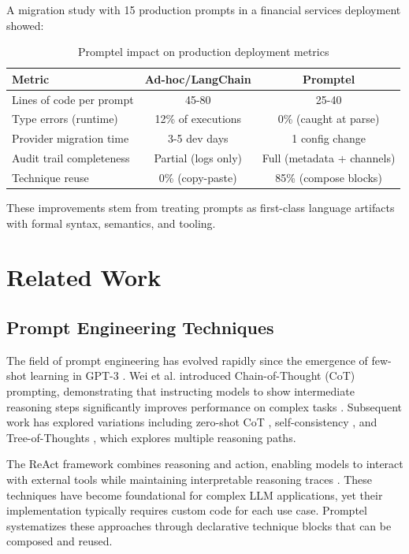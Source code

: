 \documentclass[11pt,a4paper]{article}
\begin{document}
A migration study with 15 production prompts in a financial services deployment showed:

\begin{table}[h]
\centering
\begin{tabular}{lcc}
\toprule
\textbf{Metric} & \textbf{Ad-hoc/LangChain} & \textbf{Promptel} \\
\midrule
Lines of code per prompt & 45-80 & 25-40 \\
Type errors (runtime) & 12\% of executions & 0\% (caught at parse) \\
Provider migration time & 3-5 dev days & 1 config change \\
Audit trail completeness & Partial (logs only) & Full (metadata + channels) \\
Technique reuse & 0\% (copy-paste) & 85\% (compose blocks) \\
\bottomrule
\end{tabular}
\caption{Promptel impact on production deployment metrics}
\label{tab:impact}
\end{table}

These improvements stem from treating prompts as first-class language artifacts with formal syntax, semantics, and tooling.

\section{Related Work}

\subsection{Prompt Engineering Techniques}

The field of prompt engineering has evolved rapidly since the emergence of few-shot learning in GPT-3 \cite{brown2020language}. Wei et al. introduced Chain-of-Thought (CoT) prompting, demonstrating that instructing models to show intermediate reasoning steps significantly improves performance on complex tasks \cite{wei2022chain}. Subsequent work has explored variations including zero-shot CoT \cite{kojima2022large}, self-consistency \cite{wang2022self}, and Tree-of-Thoughts \cite{yao2023tree}, which explores multiple reasoning paths.

The ReAct framework combines reasoning and action, enabling models to interact with external tools while maintaining interpretable reasoning traces \cite{yao2022react}. These techniques have become foundational for complex LLM applications, yet their implementation typically requires custom code for each use case. Promptel systematizes these approaches through declarative technique blocks that can be composed and reused.
\end{document}
